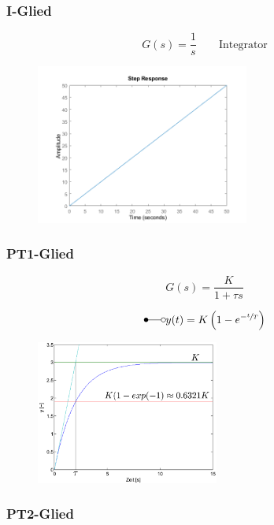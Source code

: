 \documentclass[
  10pt,
  a4paper,
  twocolumn]{article}
\numberwithin{equation}{section}
\begin{document}
\hypertarget{i-glied}{%
\subsubsection{I-Glied}\label{i-glied}}

\[
G(s)=\frac1{s}\qquad\text{Integrator}
\]

\begin{figure}[H]

{\centering \includegraphics[width=7cm,height=\textheight]{images/paste-22.png}

}

\end{figure}

\hypertarget{pt1-glied}{%
\subsubsection{PT1-Glied}\label{pt1-glied}}

\[
G(s)=\frac{K}{1+\tau s}
\]

\[
\Laplace y(t) = K\left(1-e^{-\sfrac{t}{T}}\right)
\]

\begin{figure}[H]

{\centering \includegraphics[width=6cm,height=\textheight]{images/paste-20.png}

}

\end{figure}

\hypertarget{pt2-glied}{%
\subsubsection{PT2-Glied}\label{pt2-glied}}
\end{document}
